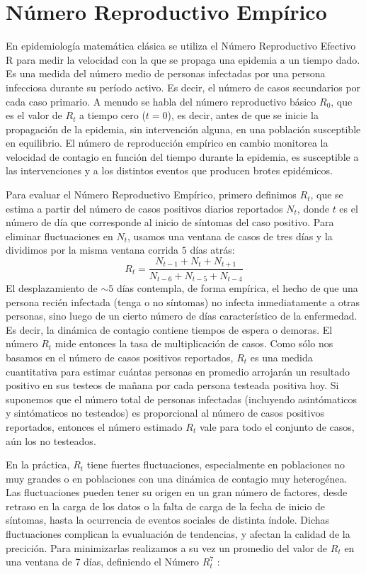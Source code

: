 \documentclass[12pt,a4paper]{article}
\begin{document}
\section*{Número Reproductivo Empírico}
En epidemiología matemática clásica se utiliza el Número Reproductivo Efectivo 
{\cal R} para medir la velocidad con la que se propaga una epidemia a un tiempo dado. 
Es una medida del número medio de personas infectadas por una persona 
infecciosa durante su período activo. Es decir, el número de casos secundarios por cada caso primario. 
A menudo se habla del número reproductivo básico $R_0$, que es el valor 
de $R_t$ a tiempo cero ($t=0$), es decir, antes de que se inicie 
la propagación de la epidemia, sin intervención alguna, en una 
población susceptible en equilibrio. El número de reproducción empírico 
en cambio monitorea la velocidad de contagio en función del tiempo durante la epidemia, 
es susceptible a las intervenciones y a los distintos eventos que producen 
brotes epidémicos.


Para evaluar el Número Reproductivo Empírico, primero definimos $R_t$, que
se estima a partir del número de casos positivos diarios reportados $N_t$, 
donde $t$ es el número de día que corresponde al inicio de síntomas del caso 
positivo. Para eliminar fluctuaciones en $N_t$, usamos una 
ventana de casos de tres días y la dividimos por la misma ventana corrida $5$ 
días atrás:
\begin{equation}
R_t = \frac{N_{t-1}+N_{t}+N_{t+1}}{N_{t-6}+N_{t-5}+N_{t-4}}
\end{equation}
El desplazamiento de $\sim 5$ días contempla, 
de forma empírica, el hecho de que una persona recién 
infectada (tenga o no síntomas) no infecta inmediatamente a otras personas, 
sino luego de un cierto número de días característico de la enfermedad.
Es decir, la dinámica de contagio contiene tiempos de espera o demoras. 
El número $R_t$ mide entonces 
la tasa de multiplicación de casos. Como sólo nos basamos 
en el número de casos positivos reportados, $R_t$ es una medida 
cuantitativa para estimar cuántas personas en promedio arrojarán un 
resultado positivo en sus testeos de mañana por cada 
persona testeada positiva hoy. Si suponemos que el número total 
de personas infectadas (incluyendo asintómaticos y sintómaticos no testeados) 
es proporcional al número de casos positivos reportados, entonces el número estimado
$R_t$ vale para todo el conjunto de casos, aún los no testeados.



En la práctica, $R_t$ tiene fuertes fluctuaciones, especialmente en poblaciones 
no muy grandes o en poblaciones con una dinámica de contagio muy heterogénea. 
Las fluctuaciones pueden tener su origen en un gran número de factores, 
desde retraso en la carga de los datos o la falta de carga de la 
fecha de inicio de síntomas, hasta la ocurrencia de eventos sociales de distinta índole. 
Dichas fluctuaciones complican la evualuación de tendencias, y afectan la calidad de la 
precición. Para minimizarlas realizamos a su vez 
un promedio del valor de $R_t$ en una ventana de 7 días, 
definiendo el Número $R^7_t$ :
\end{document}
